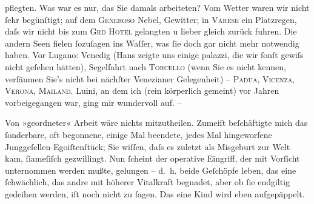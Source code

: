                pflegten. Was war es nur, das Sie damals arbeiteten? Vom Wetter waren wir nicht ſehr
               begünſtigt; auf dem \textsc{Generoso} Nebel, Gewitter; in \textsc{Varese} ein Platzregen, daſs wir nicht \introOben{}bis\introOben{} zum \textsc{Grd Hotel} gelangten u lieber gleich zurück fuhren. Die andern Seen fielen ſozuſagen ins
               Waſſer, was ſie doch gar nicht mehr notwendig haben. Vor Lugano: Venedig (Hans zeigte uns einige {\pb}palazzi, die wir ſonſt gewiſs nicht geſehen hätten),
               Segelfahrt nach \textsc{Torcello} (wenn Sie es nicht kennen, verſäumen Sie’s nicht bei nächſter Venezianer Gelegenheit) – \textsc{Padua}, \textsc{Vicenza}, \textsc{Verona}, \textsc{Mailand}. Luini, an dem ich (rein körperlich
               gemeint) vor Jahren vorbeigegangen war, ging mir wundervoll auf. –\pend
           
\pstart
           Von »geordneter« Arbeit wäre nichts mitzutheilen. Zumeiſt beſchäftigte mich das
               ſonderbare, {\pb}oft begonnene, einige Mal beendete, jedes
               Mal hingeworfene Junggeſellen\textcolor{gray}{-}Egoiſtenſtück; Sie wiſſen, daſs es
               zuletzt als Misgeburt zur Welt kam, ſiameſiſch gezwillingt. Nun ſcheint der operative
               Eingriff, der mit Vorſicht unternommen werden mußte, gelungen – d. h. beide Geſchöpfe
               leben, das eine ſchwächlich, das andre mit höherer Vitalkraft begnadet, {\pb}aber ob ſie endgiltig gedeihen werden, iſt noch nicht zu
               ſagen. Das eine Kind wird eben aufgepäppelt.\pend
           
